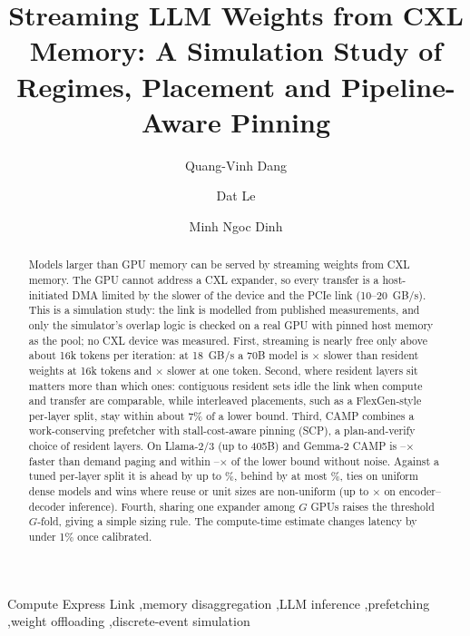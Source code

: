 \documentclass[preprint,12pt]{elsarticle}
\newcommand{\camp}{\textsc{CAMP}}
\begin{document}
\begin{frontmatter}

\title{Streaming LLM Weights from CXL Memory: A Simulation Study of Regimes, Placement and Pipeline-Aware Pinning}

\author[buv]{Quang-Vinh Dang}
\author[uef]{Dat Le}
\author[mil]{Minh Ngoc Dinh}
\address[buv]{British University Vietnam, Hung Yen, Vietnam}
\address[uef]{Department of Science, Technology, and International Projects, Ho Chi Minh City University of Economics and Finance, Ho Chi Minh City 700000, Vietnam}
\address[mil]{Millennia Education, Ho Chi Minh City, Vietnam}

\begin{abstract}
Models larger than GPU memory can be served by streaming weights from CXL memory. The GPU cannot address a CXL expander, so every transfer is a host-initiated DMA limited by the slower of the device and the PCIe link (10--20~GB/s). This is a simulation study: the link is modelled from published measurements, and only the simulator's overlap logic is checked on a real GPU with pinned host memory as the pool; no CXL device was measured. First, streaming is nearly free only above about 16k tokens per iteration: at 18~GB/s a 70B model is \nRegSlowSixteenKEighteen$\times$ slower than resident weights at 16k tokens and \nRegSlowOneEighteen$\times$ slower at one token. Second, where resident layers sit matters more than which ones: contiguous resident sets idle the link when compute and transfer are comparable, while interleaved placements, such as a FlexGen-style per-layer split, stay within about 7\% of a lower bound. Third, \camp{} combines a work-conserving prefetcher with stall-cost-aware pinning (SCP), a plan-and-verify choice of resident layers. On Llama-2/3 (up to 405B) and Gemma-2 \camp{} is \nDemOverCampMin--\nDemOverCampMax$\times$ faster than demand paging and within \nDetLbMed--\nDetLbMax$\times$ of the lower bound without noise. Against a tuned per-layer split it is ahead by up to \nExtOverCampMaxPct\%, behind by at most \nWorstLossExt\%, ties on uniform dense models and wins where reuse or unit sizes are non-uniform (up to \nHetEncFg$\times$ on encoder--decoder inference). Fourth, sharing one expander among $G$ GPUs raises the threshold $G$-fold, giving a simple sizing rule. The compute-time estimate changes latency by under 1\% once calibrated.
\end{abstract}

\begin{keyword}
Compute Express Link \sep memory disaggregation \sep LLM inference \sep prefetching \sep weight offloading \sep discrete-event simulation
\end{keyword}

\end{frontmatter}
\end{document}
